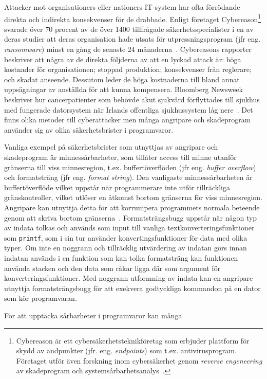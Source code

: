 Attacker mot organisationers eller nationers IT-system har ofta förrödande
direkta och indirekta konsekvenser för de drabbade. Enligt företaget
Cybereason\footnote{Cybereason är ett cybersäkerhetsteknikföretag som erbjuder
plattform för skydd av ändpunkter (jfr. eng. \emph{endpoints}) som t.ex.
antivirusprogram. Företaget utför även forskning inom cybersäkerhet genom
\emph{reverse engeneering} av skadeprogram och
systemsårbarhetsanalys~\cite{enwiki:1147596623}.} svarade över 70 procent av de
över 1400 tillfrågade säkerhetsspecialister i en
av deras studier att deras organisation hade utsats för
utpressningsprogram (jfr eng. \emph{ransomware}) minst en gång de senaste
24 månaderna~\cite{cyberreason2021, cyberreason2022}. Cybereasons rapporter
beskriver att några av de direkta följderna av att en lyckad attack är: höga
kostnader för organisationen; stoppad produktion; konsekvenser från reglerare;
och skadat anseende. Dessutom leder de höga kostnaderna till
bland annat uppsägningar av anställda för att kunna kompensera. Bloomberg
Newsweek~\cite{gallagher2023} beskriver hur cancerpatienter som behövde akut
sjukvård förflyttades till sjukhus med fungerade datorsystem när Irlands
offentliga sjukhussystem låg nere~\cite{hse_report}. Det finns olika
metoder till cyberattacker men många angripare och skadeprogram använder sig av
olika säkerhetsbrister i programvaror.

Vanliga exempel på säkerhetsbrister som utnyttjas av angripare och skadeprogram
är minnessårbarheter, som tillåter access till minne utanför gränserna till
viss minnesregion, t.ex. buffertöverflöden (jfr eng. \emph{buffer
overflow}) och formatsträng (jfr eng. \emph{format string}). Den
vanligaste minnessårbarheten är buffertöverflöde vilket uppstår när
programmerare inte utför tillräckliga gränskontroller, vilket
utlöser en åtkomst bortom gränserna för viss minnesregion. Angripare kan
utnyttja detta för att korrumpera programmets normala beteende genom att skriva
bortom gränserna~\cite{computer_security_cs161}. Formatsträngsbugg uppstår när
någon typ av indata tolkas och används som input till vanliga
textkonverteringsfunktioner som \texttt{printf}, som i sin tur använder
konvertingsfunktioner för data med olika typer. Om inte en noggrann och
tillräcklig utvärdering av indatan görs innan indatan används i en funktion som
kan tolka formatsträng kan funktionen använda stacken och den data som råkar
ligga där som argument för konverteringsfunktioner. Med noggrann utformning av
indata kan en angripare utnyttja formatsträngsbugg för att exekvera godtyckliga
kommandon på en dator som kör programvaran.

För att upptäcka sårbarheter i programvaror kan många 
